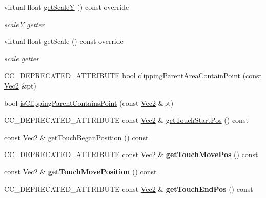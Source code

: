 \begin{DoxyCompactItemize}
virtual float \hyperlink{classui_1_1Widget_af9953371b66c5e1a608c5f7f009093fd}{get\+ScaleY} () const override
\begin{DoxyCompactList}\small\item\em scaleY getter \end{DoxyCompactList}\item 
virtual float \hyperlink{classui_1_1Widget_a3decfabeeedb5fac08d9717f7c5421a3}{get\+Scale} () const override
\begin{DoxyCompactList}\small\item\em scale getter \end{DoxyCompactList}\item 
C\+C\+\_\+\+D\+E\+P\+R\+E\+C\+A\+T\+E\+D\+\_\+\+A\+T\+T\+R\+I\+B\+U\+TE bool \hyperlink{classui_1_1Widget_a6ec279041bfbb56c145ba69471cfef9b}{clipping\+Parent\+Area\+Contain\+Point} (const \hyperlink{classVec2}{Vec2} \&pt)
\item 
bool \hyperlink{classui_1_1Widget_a13fbdff1391a7936b8fd26d9257fc071}{is\+Clipping\+Parent\+Contains\+Point} (const \hyperlink{classVec2}{Vec2} \&pt)
\item 
C\+C\+\_\+\+D\+E\+P\+R\+E\+C\+A\+T\+E\+D\+\_\+\+A\+T\+T\+R\+I\+B\+U\+TE const \hyperlink{classVec2}{Vec2} \& \hyperlink{classui_1_1Widget_a6b930ace2f89e8fe077836d49701fda3}{get\+Touch\+Start\+Pos} () const
\item 
const \hyperlink{classVec2}{Vec2} \& \hyperlink{classui_1_1Widget_a713f9728086cf5bff220dcafe4f47d38}{get\+Touch\+Began\+Position} () const
\item 
\mbox{\label{classui_1_1Widget_a826436211ac2fec2eadbbcd8ff7489c0}} 
C\+C\+\_\+\+D\+E\+P\+R\+E\+C\+A\+T\+E\+D\+\_\+\+A\+T\+T\+R\+I\+B\+U\+TE const \hyperlink{classVec2}{Vec2} \& {\bfseries get\+Touch\+Move\+Pos} () const
\item 
\mbox{\label{classui_1_1Widget_a1c11c290534a71db1c6de2d2a90630f8}} 
const \hyperlink{classVec2}{Vec2} \& {\bfseries get\+Touch\+Move\+Position} () const
\item 
\mbox{\label{classui_1_1Widget_a1b15dc85b15a2c4c007eda6914be8c0e}} 
C\+C\+\_\+\+D\+E\+P\+R\+E\+C\+A\+T\+E\+D\+\_\+\+A\+T\+T\+R\+I\+B\+U\+TE const \hyperlink{classVec2}{Vec2} \& {\bfseries get\+Touch\+End\+Pos} () const
\item 
\mbox{\label{classui_1_1Widget_a9e7de44d33c14599e4981a86bb2e282a}} 

\end{DoxyCompactItemize}
